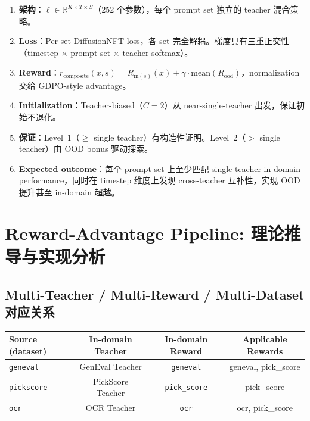 \documentclass[11pt,a4paper]{article}
\newcommand{\R}{\mathbb{R}}
\theoremstyle{definition}
\begin{document}
\begin{tcolorbox}[colback=green!5, colframe=green!50!black, title=Phase 2 核心设计总结]
\begin{enumerate}[leftmargin=1.5em]
\item \textbf{架构}：$\ell \in \R^{K \times T \times S}$（252 个参数），每个 prompt set 独立的 teacher 混合策略。

\item \textbf{Loss}：Per-set DiffusionNFT loss，各 set 完全解耦。梯度具有三重正交性（timestep × prompt-set × teacher-softmax）。

\item \textbf{Reward}：$r_{\mathrm{composite}}(x, s) = R_{\mathrm{in}(s)}(x) + \gamma \cdot \mathrm{mean}(R_{\mathrm{ood}})$，normalization 交给 GDPO-style advantage。

\item \textbf{Initialization}：Teacher-biased（$C=2$）从 near-single-teacher 出发，保证初始不退化。

\item \textbf{保证}：Level~1（$\geq$ single teacher）有构造性证明。Level~2（$>$ single teacher）由 OOD bonus 驱动探索。

\item \textbf{Expected outcome}：每个 prompt set 上至少匹配 single teacher in-domain performance，同时在 timestep 维度上发现 cross-teacher 互补性，实现 OOD 提升甚至 in-domain 超越。
\end{enumerate}
\end{tcolorbox}

\section{Reward-Advantage Pipeline: 理论推导与实现分析}
\label{sec:reward_advantage}

\subsection{Multi-Teacher / Multi-Reward / Multi-Dataset 对应关系}

\begin{center}
\renewcommand{\arraystretch}{1.4}
\begin{tabular}{@{}lccc@{}}
\toprule
\textbf{Source (dataset)} & \textbf{In-domain Teacher} & \textbf{In-domain Reward} & \textbf{Applicable Rewards} \\
\midrule
\texttt{geneval} & GenEval Teacher & \texttt{geneval} & geneval, pick\_score \\
\texttt{pickscore} & PickScore Teacher & \texttt{pick\_score} & pick\_score \\
\texttt{ocr} & OCR Teacher & \texttt{ocr} & ocr, pick\_score \\
\bottomrule
\end{tabular}
\end{center}
\end{document}
